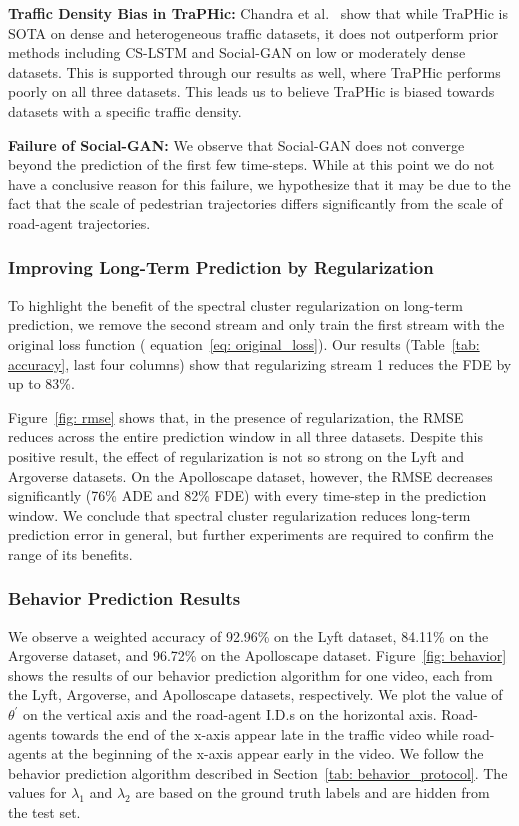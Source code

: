 \documentclass[10pt,twocolumn,letterpaper]{article}
\theoremstyle{plain}
\begin{document}
\textbf{Traffic Density Bias in TraPHic:} Chandra et al.~\cite{traphic} show that while TraPHic is SOTA on dense and heterogeneous traffic datasets, it does not outperform prior methods including CS-LSTM and Social-GAN on low or moderately dense datasets. This is supported through our results as well, where TraPHic performs poorly on all three datasets. This leads us to believe TraPHic is biased towards datasets with a specific traffic density.

\textbf{Failure of Social-GAN:} We observe that Social-GAN does not converge beyond the prediction of the first few time-steps. While at this point we do not have a conclusive reason for this failure, we hypothesize that it may be due to the fact that the scale of pedestrian trajectories differs significantly from the scale of road-agent trajectories. 
\subsubsection{Improving Long-Term Prediction by Regularization}

To highlight the benefit of the spectral cluster regularization on long-term prediction, we remove the second stream and only train the first stream with the original loss function ( equation~\ref{eq: original_loss}). Our results (Table~\ref{tab: accuracy}, last four columns) show that regularizing stream 1 reduces the FDE by up to 83\%. 

Figure~\ref{fig: rmse} shows that, in the presence of regularization, the RMSE reduces across the entire prediction window in all three datasets. Despite this positive result, the effect of regularization is not so strong on the Lyft and Argoverse datasets. On the Apolloscape dataset, however, the RMSE decreases significantly (76\% ADE and 82\% FDE) with every time-step in the prediction window. We conclude that spectral cluster regularization reduces long-term prediction error in general, but further experiments are required to confirm the range of its benefits.
\subsubsection{Behavior Prediction Results} 
We observe a weighted accuracy of 92.96\% on the Lyft dataset, 84.11\% on the Argoverse dataset, and 96.72\% on the Apolloscape dataset. Figure~\ref{fig: behavior} shows the results of our behavior prediction algorithm for one video, each from the Lyft, Argoverse, and Apolloscape datasets, respectively. We plot the value of $\theta^{'}$ on the vertical axis and the road-agent I.D.s on the horizontal axis. Road-agents towards the end of the x-axis appear late in the traffic video while road-agents at the beginning of the x-axis appear early in the video. We follow the behavior prediction algorithm described in Section~\ref{tab: behavior_protocol}. The values for $\lambda_1$ and $\lambda_2$ are based on the ground truth labels and are hidden from the test set. 
\end{document}
